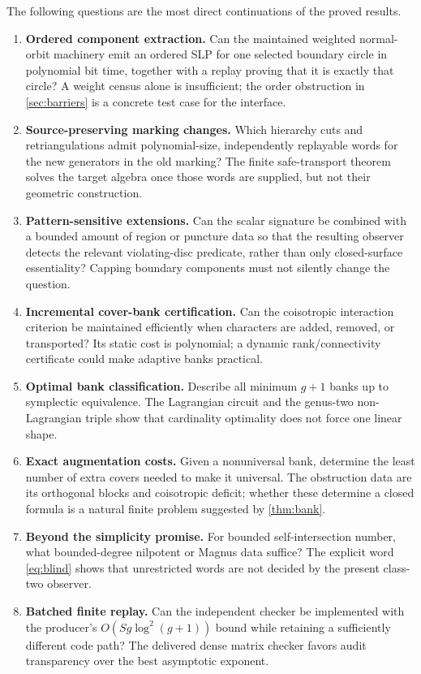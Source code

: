 \documentclass[11pt,letterpaper]{article}
\theoremstyle{definition}
\theoremstyle{remark}
\begin{document}
The following questions are the most direct continuations of the proved results.
\begin{enumerate}[label=\textbf{Q\arabic*.},leftmargin=*]
\item \textbf{Ordered component extraction.} Can the maintained weighted normal-orbit machinery emit an ordered SLP for one selected boundary circle in polynomial bit time, together with a replay proving that it is exactly that circle? A weight census alone is insufficient; the order obstruction in \cref{sec:barriers} is a concrete test case for the interface.
\item \textbf{Source-preserving marking changes.} Which hierarchy cuts and retriangulations admit polynomial-size, independently replayable words for the new generators in the old marking? The finite safe-transport theorem solves the target algebra once those words are supplied, but not their geometric construction.
\item \textbf{Pattern-sensitive extensions.} Can the scalar signature be combined with a bounded amount of region or puncture data so that the resulting observer detects the relevant violating-disc predicate, rather than only closed-surface essentiality? Capping boundary components must not silently change the question.
\item \textbf{Incremental cover-bank certification.} Can the coisotropic interaction criterion be maintained efficiently when characters are added, removed, or transported? Its static cost is polynomial; a dynamic rank/connectivity certificate could make adaptive banks practical.
\item \textbf{Optimal bank classification.} Describe all minimum $g+1$ banks up to symplectic equivalence. The Lagrangian circuit and the genus-two non-Lagrangian triple show that cardinality optimality does not force one linear shape.
\item \textbf{Exact augmentation costs.} Given a nonuniversal bank, determine the least number of extra covers needed to make it universal. The obstruction data are its orthogonal blocks and coisotropic deficit; whether these determine a closed formula is a natural finite problem suggested by \cref{thm:bank}.
\item \textbf{Beyond the simplicity promise.} For bounded self-intersection number, what bounded-degree nilpotent or Magnus data suffice? The explicit word \eqref{eq:blind} shows that unrestricted words are not decided by the present class-two observer.
\item \textbf{Batched finite replay.} Can the independent checker be implemented with the producer's $O(Sg\log^2(g+1))$ bound while retaining a sufficiently different code path? The delivered dense matrix checker favors audit transparency over the best asymptotic exponent.

\end{enumerate}
\end{document}
